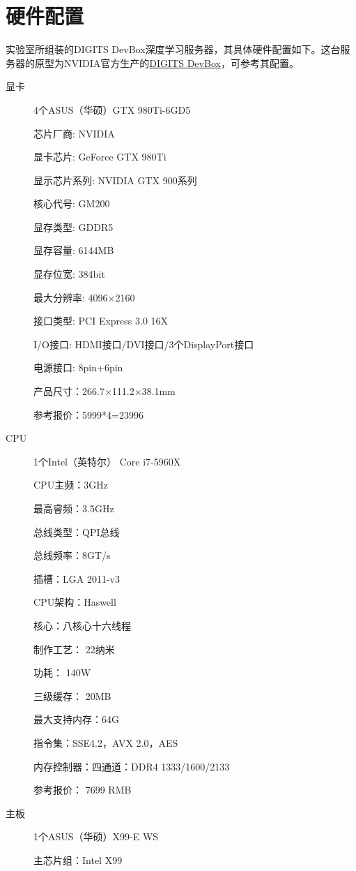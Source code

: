 \section{硬件配置}
实验室所组装的DIGITS DevBox深度学习服务器，其具体硬件配置如下。这台服务器的原型为NVIDIA官方生产的\href{https://developer.nvidia.com/devbox}{DIGITS DevBox}，可参考其配置。
\begin{description}
\item[显卡] 4个ASUS（华硕）GTX 980Ti-6GD5
\begin{shaded}
\scriptsize{
芯片厂商: NVIDIA

显卡芯片: GeForce GTX 980Ti

显示芯片系列: NVIDIA GTX 900系列

核心代号: GM200

显存类型: GDDR5

显存容量: 6144MB

显存位宽: 384bit

最大分辨率: 4096×2160

接口类型: PCI Express 3.0 16X

I/O接口: HDMI接口/DVI接口/3个DisplayPort接口

电源接口: 8pin+6pin

产品尺寸：266.7×111.2×38.1mm

参考报价：5999*4=23996} 
\end{shaded}   
\item[CPU] 1个Intel（英特尔） Core i7-5960X
\begin{shaded}
\scriptsize{
CPU主频：3GHz

最高睿频：3.5GHz 

总线类型：QPI总线

总线频率：8GT/s

插槽：LGA 2011-v3 

CPU架构：Haswell

核心：八核心十六线程

制作工艺： 22纳米

功耗： 140W

三级缓存： 20MB

最大支持内存：64G

指令集：SSE4.2，AVX 2.0，AES

内存控制器：四通道：DDR4 1333/1600/2133

参考报价： 7699 RMB} 
\end{shaded}   
\item[主板] 1个ASUS（华硕）X99-E WS
\begin{shaded}
\scriptsize{
主芯片组：Intel X99

}
\end{shaded}
\end{description}
